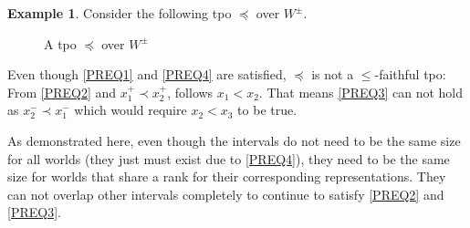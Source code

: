 \documentclass[english, 12pt]{scrartcl}
\theoremstyle{definition}
\newtheorem{example}{Example}
\theoremstyle{definition}
\theoremstyle{definition}
\begin{document}
\begin{example}
    \label{example:example-faithful-tpo}
    Consider the following tpo $\preceq$ over $W^{\pm}$.
        
    \begin{figure}[H]
        \centering
        \caption{A tpo $\preceq$ over $W^{\pm}$}
        \label{fig:example-not-tpo}
    \end{figure}
    
    Even though \ref{PREQ1} and \ref{PREQ4} are satisfied, $\preceq$ is not a $\leq$-faithful tpo: From \ref{PREQ2} and $x_{1}^{+} \prec x_{2}^{+}$, follows $x_{1} < x_{2}$. That means \ref{PREQ3} can not hold as $x_{2}^{-} \prec x_{1}^{-}$ which would require $x_{2} < x_{3}$ to be true.
    
    As demonstrated here, even though the intervals do not need to be the same size for all worlds (they just must exist due to \ref{PREQ4}), they need to be the same size for worlds that share a rank for their corresponding representations. They can not overlap other intervals completely to continue to satisfy \ref{PREQ2} and \ref{PREQ3}.
\end{example}
\end{document}
